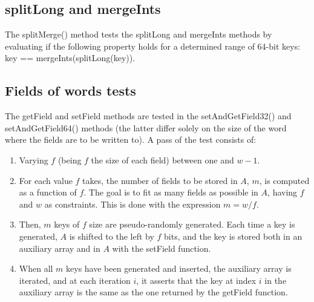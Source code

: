 \subsection{{\ttfamily splitLong} and {\ttfamily mergeInts}}

The {\ttfamily splitMerge()} method tests the {\ttfamily splitLong} and {\ttfamily mergeInts} methods by evaluating if the following property holds for a determined range of 64-bit keys: {\ttfamily key == mergeInts(splitLong(key))}.

\subsection{Fields of words tests}
The {\ttfamily getField} and {\ttfamily setField} methods are tested in the {\ttfamily setAndGetField32()} and {\ttfamily setAndGetField64()} methods (the latter differ solely on the size of the word where the fields are to be written to). A pass of the test consists of:
\begin{enumerate}
    \item
    Varying $f$ (being $f$ the size of each field) between one and $w - 1$.
    
    \item
    For each value $f$ takes, the number of fields to be stored in $A$, $m$, is computed as a function of $f$. The goal is to fit as many fields as possible in $A$, having $f$ and $w$ as constraints. This is done with the expression $m = w / f$.
    
    \item
    Then, $m$ keys of $f$ size are pseudo-randomly generated. Each time a key is generated, $A$ is shifted to the left by $f$ bits, and the key is stored both in an auxiliary array and in $A$ with the {\ttfamily setField} function. 
    
    \item
    When all $m$ keys have been generated and inserted, the auxiliary array is iterated, and at each iteration $i$, it asserts that the key at index $i$ in the auxiliary array is the same as the one returned by the {\ttfamily getField} function.
\end{enumerate}

